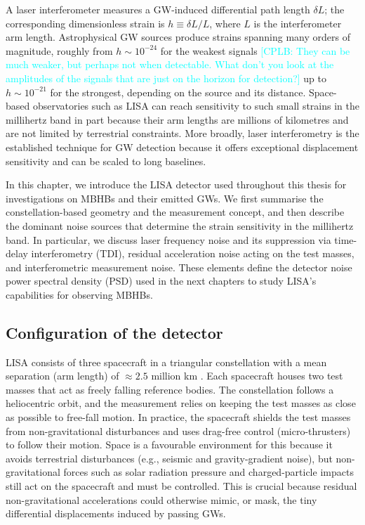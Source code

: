 \documentclass[a4paper,12pt]{article}
\newcommand{\cplb}[1]{\textcolor{cyan}{[CPLB: #1]}}
\begin{document}
A laser interferometer measures a GW-induced differential path length $\delta L$; the corresponding dimensionless strain is $h\equiv\delta L/L$, where $L$ is the interferometer arm length. Astrophysical GW sources produce strains spanning many orders of magnitude, roughly from $h\sim10^{-24}$ for the weakest signals \cplb{They can be much weaker, but perhaps not when detectable. What don't you look at the amplitudes of the signals that are just on the horizon for detection?} up to $h\sim10^{-21}$ for the strongest, depending on the source and its distance\cite{prince2011lisa}. Space-based observatories such as LISA can reach sensitivity to such small strains in the millihertz band in part because their arm lengths are millions of kilometres and are not limited by terrestrial constraints. More broadly, laser interferometry is the established technique for GW detection because it offers exceptional displacement sensitivity and can be scaled to long baselines. 

In this chapter, we introduce the LISA detector used throughout this thesis for investigations on MBHBs and their emitted GWs. We first summarise the constellation-based geometry and the measurement concept, and then describe the dominant noise sources that determine the strain sensitivity in the millihertz band. In particular, we discuss laser frequency noise and its suppression via time-delay interferometry (TDI), residual acceleration noise acting on the test masses, and interferometric measurement noise. These elements define the detector noise power spectral density (PSD) used in the next chapters to study LISA's capabilities for observing MBHBs.

\subsection{Configuration of the detector}
\label{subsec:ConfigDet}

LISA consists of three spacecraft in a triangular constellation with a mean separation (arm length) of $\approx2.5$ million km \cite{prince2011lisa,amaro2017laser}. Each spacecraft houses two test masses that act as freely falling reference bodies. The constellation follows a heliocentric orbit, and the measurement relies on keeping the test masses as close as possible to free-fall motion. In practice, the spacecraft shields the test masses from non-gravitational disturbances and uses drag-free control (micro-thrusters) to follow their motion\cite{armano2016sub}. Space is a favourable environment for this because it avoids terrestrial disturbances (e.g., seismic and gravity-gradient noise), but non-gravitational forces such as solar radiation pressure and charged-particle impacts still act on the spacecraft and must be controlled. This is crucial because residual non-gravitational accelerations could otherwise mimic, or mask, the tiny differential displacements induced by passing GWs. 
\end{document}
